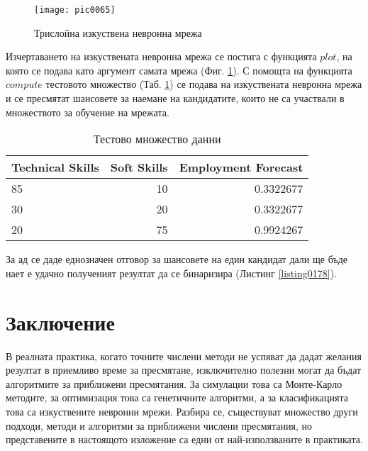 \begin{figure}[h!]
  \centering
  \texttt{[image: pic0065]}
  \caption{Трислойна изкуствена невронна мрежа}
\label{figure0065}
\end{figure}
\FloatBarrier

Изчертаването на изкуствената невронна мрежа се постига с функцията $plot$, на която се подава като аргумент самата мрежа (Фиг. \ref{figure0065}). С помощта на функцията $compute$ тестовото множество (Таб. \ref{table0008}) се подава на изкуствената невронна мрежа и се пресмятат шансовете за наемане на кандидатите, които не са участвали в множеството за обучение на мрежата.

\begin{table}[h!]
\centering
\begin{tabular}{|l|r|r|} 
	\rowcolor{lightgray}
	\hline
	Technical Skills & Soft Skills & Employment Forecast \\
	\hline\hline
	85 & 10 & 0.3322677 \\
	\hline
	30 & 20 & 0.3322677 \\
	\hline
	20 & 75 & 0.9924267 \\
	\hline
\end{tabular}
\caption{Тестово множество данни}
\label{table0008}
\end{table}

За ад се даде еднозначен отговор за шансовете на един кандидат дали ще бъде нает е удачно полученият резултат да се бинаризира (Листинг \ref{listing0178}).

\section*{Заключение}

В реалната практика, когато точните числени методи не успяват да дадат желания резултат в приемливо време за пресмятане, изключително полезни могат да бъдат алгоритмите за приближени пресмятания. За симулации това са Монте-Карло методите, за оптимизация това са генетичните алгоритми, а за класификацията това са изкуствените невронни мрежи. Разбира се, съществуват множество други подходи, методи и алгоритми за приближени числени пресмятания, но представените в настоящото изложение са едни от най-използваните в практиката.

